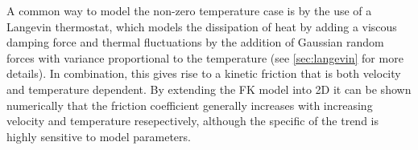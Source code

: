 
A common way to model the non-zero temperature case is by the use of a Langevin
thermostat, which models the dissipation of heat by adding a viscous damping
force and thermal fluctuations by the addition of Gaussian random forces with
variance proportional to the temperature (see \cref{sec:langevin} for more details). In combination, this gives rise to a kinetic
friction that is both velocity and temperature dependent. By extending the FK model into 2D \cite{FK2D} it can be shown numerically that
the friction coefficient generally increases with increasing velocity and
temperature resepectively, although the specific of the trend is highly
sensitive to model parameters. 

















